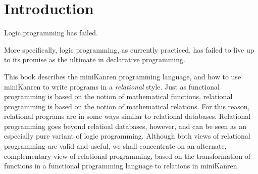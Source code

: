 \chapter*{Introduction}


Logic programming has failed.

More specifically, logic programming, as currently practiced, has failed to live up to its promise as the ultimate in declarative programming.

This book describes the miniKanren programming language, and how to use miniKanren to write programs in a {\em relational} style.  Just as functional programming is based on the notion of mathematical functions, relational programming is based on the notion of mathematical relations.  For this reason, relational programs are in some ways similar to relational databases.  Relational programming goes beyond relatioal databases, however, and can be seen as an especially pure variant of logic programming.  Although both views of relational programming are valid and useful, we shall concentrate on an alternate, complementary view of relational programming, based on the transformation of functions in a functional programming language to relations in miniKanren.




